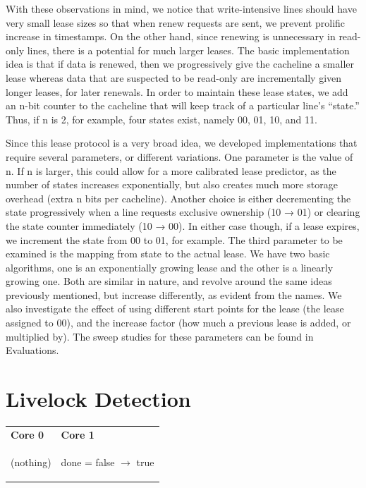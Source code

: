 \documentclass[12pt]{article}
\begin{document}
With these observations in mind, we notice that write-intensive lines should have very small lease sizes so that when renew requests are sent, we prevent prolific increase in timestamps. On the other hand, since renewing is unnecessary in read-only lines, there is a potential for much larger leases.
The basic implementation idea is that if data is renewed, then we progressively give the cacheline a smaller lease whereas data that are suspected to be read-only are incrementally given longer leases, for later renewals. In order to maintain these lease states, we add an n-bit counter to the cacheline that will keep track of a particular line’s “state.” Thus, if n is 2, for example, four states exist, namely 00, 01, 10, and 11. 

Since this lease protocol is a very broad idea, we developed implementations that require several parameters, or different variations. One parameter is the value of n. If n is larger, this could allow for a more calibrated lease predictor, as the number of states increases exponentially, but also creates much more storage overhead (extra n bits per cacheline). Another choice is either decrementing the state progressively when a line requests exclusive ownership (10 → 01) or clearing the state counter immediately (10 → 00). In either case though, if a lease expires, we increment the state from 00 to 01, for example. The third parameter to be examined is the mapping from state to the actual lease. We have two basic algorithms, one is an exponentially growing lease and the other is a linearly growing one. Both are similar in nature, and revolve around the same ideas previously mentioned, but increase differently, as evident from the names. We also investigate the effect of using different start points for the lease (the lease assigned to 00), and the increase factor (how much a previous lease is added, or multiplied by). The sweep studies for these parameters can be found in Evaluations.

\section{Livelock Detection}

\begin{center}
	
	\begin{tabular}{p{5cm} p{5cm}}
		\textbf{Core 0} & \textbf{Core 1} \\
		\begin{algorithm}[H]
			\While{!done}
			{(nothing)}
			
		\end{algorithm}
		&
		\begin{algorithm}[H]
			done = false $\rightarrow$  true
		\end{algorithm}
		\\
	\end{tabular}
	
\end{center}
\end{document}
